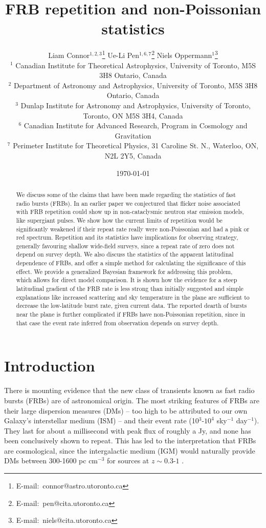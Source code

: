 \documentclass[useAMS,usenatbib]{mn2e}
\title{FRB repetition and non-Poissonian statistics}
\author[Connor et al.]{
Liam Connor$^{1,2,3}$\thanks{E-mail:\ connor@astro.utoronto.ca}
Ue-Li Pen$^{1, 6, 7}$\thanks{E-mail:\ pen@cita.utoronto.ca}
Niels Oppermann$^{1}$\thanks{E-mail:\ niels@cita.utoronto.ca}
\\
$^1$ Canadian Institute for Theoretical Astrophysics, University of Toronto, M5S 3H8 Ontario, Canada
\\
$^2$ Department of Astronomy and Astrophysics, University of Toronto, 
M5S 3H8 Ontario, Canada
\\
$^3$ Dunlap Institute for Astronomy and Astrophysics, University of Toronto,
Toronto, ON M5S 3H4, Canada
\\
$^6$ Canadian Institute for Advanced Research, Program in Cosmology
and Gravitation
\\
$^7$ Perimeter Institute for Theoretical Physics, 31 Caroline St. N., Waterloo, ON, N2L 2Y5, Canada
}
\begin{document}
\date{\today}
\pagerange{\pageref{firstpage}--\pageref{lastpage}} 
\maketitle
\label{firstpage}

\begin{abstract}
We discuss some of the claims that have been made regarding the statistics of 
fast radio bursts (FRBs). In an earlier paper \citep{2015arXiv150505535C} 
we conjectured that flicker noise associated 
with FRB repetition could show up in non-cataclysmic neutron star emission models,
like supergiant pulses. We show how the current limits of repetition 
would be significantly weakened if their repeat rate really were non-Poissonian
and had a pink or red spectrum.
Repetition and its statistics have implications for observing strategy, generally favouring 
shallow wide-field surveys, since a repeat rate of zero does not depend on survey depth. 
We also discuss the statistics of the apparent latitudinal dependence of FRBs, and offer
a simple method for calculating the significance of this effect.  We provide a generalized Bayesian framework for addressing 
this problem, which allows for direct model comparison. 
It is shown how 
the evidence for a steep latitudinal gradient of the FRB rate is less strong than initially suggested 
and simple explanations like increased scattering and sky temperature 
in the plane are sufficient to decrease the low-latitude burst rate, given current data.
The reported dearth of bursts near the plane is further complicated if FRBs have 
non-Poissonian repetition, since in that case the event rate inferred from observation
depends on survey depth.
\end{abstract}
\begin{keywords}
\end{keywords}

\newcommand{\be}{\begin{eqnarray}}
\newcommand{\ee}{\end{eqnarray}}
\newcommand{\beq}{\begin{equation}}
\newcommand{\eeq}{\end{equation}}

\section{Introduction}
There is mounting evidence that the new class of transients 
known as fast radio bursts (FRBs) are of astronomical origin.
The most striking features of FRBs are their large dispersion
measures (DMs) -- too high to be attributed to our own Galaxy's
interstellar medium (ISM) --
and their event rate (10$^3$-$10^4$ sky$^{-1}$ day$^{-1}$). They
last for about a millisecond with peak flux of roughly a Jy, and none
has been conclusively shown to repeat. This has led to the 
interpretation that FRBs are cosmological,
since the intergalactic medium (IGM) would naturally provide
DMs between 300-1600 pc cm$^{-3}$ for sources at 
$z\sim0.3$-$1$ \citep{2013Sci...341...53T}. 
\end{document}
